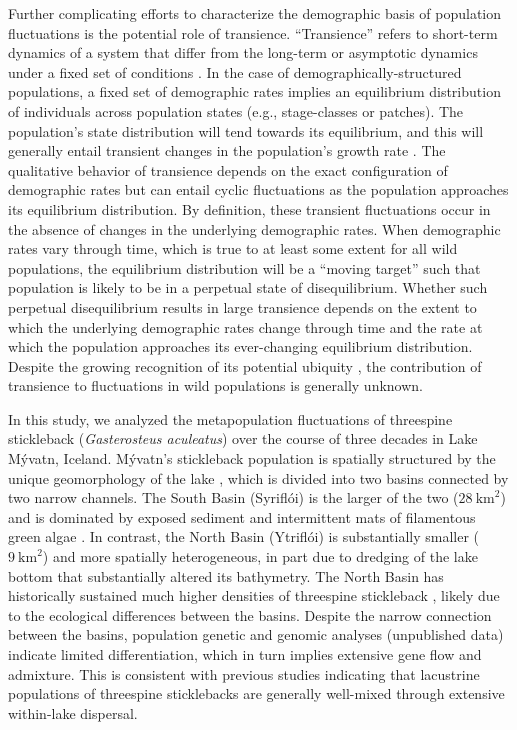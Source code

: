 \documentclass[11pt]{article}
\begin{document}
Further complicating efforts to characterize the demographic basis 
of population fluctuations is the potential role of transience.
``Transience'' refers to short-term dynamics of a system 
that differ from the long-term or asymptotic dynamics under a fixed set of conditions
\citep{hastings2010}.
In the case of demographically-structured populations,
a fixed set of demographic rates implies an equilibrium distribution
of individuals across population states (e.g., stage-classes or patches).
The population's state distribution will tend towards its equilibrium,
and this will generally entail transient changes 
in the population's growth rate \citep{caswell2001matrix}.
The qualitative behavior of transience depends
on the exact configuration of demographic rates
but can entail cyclic fluctuations 
as the population approaches its equilibrium distribution.
By definition, these transient fluctuations occur in the absence of changes in the 
underlying demographic rates.
When demographic rates vary through time,
which is true to at least some extent for all wild populations,
the equilibrium distribution will be a ``moving target''
such that population is likely to be in a perpetual state of disequilibrium.
Whether such perpetual disequilibrium results in large transience 
depends on the extent to which the underlying demographic rates change through time
and the rate at which the population approaches its ever-changing equilibrium distribution.
Despite the growing recognition of its potential ubiquity
\citep{caswell2007sensitivity, koons2017understanding},
the contribution of transience to fluctuations in wild populations is generally unknown.

In this study, 
we analyzed the metapopulation fluctuations of threespine stickleback 
(\textit{Gasterosteus aculeatus})
over the course of three decades in Lake M\'{y}vatn, Iceland.
M\'{y}vatn's stickleback population is spatially structured by the unique geomorphology
of the lake \citep{gislason1998, millet2013}, 
which is divided into two basins connected by two narrow channels.
The South Basin (Sy{\dh}rifl\'{o}i) is the larger of the two ($28~\text{km}^2$) 
and is dominated by exposed sediment and intermittent mats of filamentous green algae
\citep{einarsson2004myvatn}.
In contrast, the North Basin (Ytrifl\'{o}i) is substantially smaller ($9~\text{km}^2$)
and more spatially heterogeneous, 
in part due to dredging of the lake bottom
that substantially altered its bathymetry.
The North Basin has historically sustained much higher
densities of threespine stickleback  \citep{gislason1998}, 
likely due to the ecological differences between the basins. 
Despite the narrow connection between the basins, 
population genetic \citep{millet2013} 
and genomic analyses (unpublished data) indicate limited differentiation,
which in turn implies extensive gene flow and admixture.
This is consistent with previous studies indicating that lacustrine populations
of threespine sticklebacks are generally well-mixed through extensive within-lake dispersal.
\end{document}
